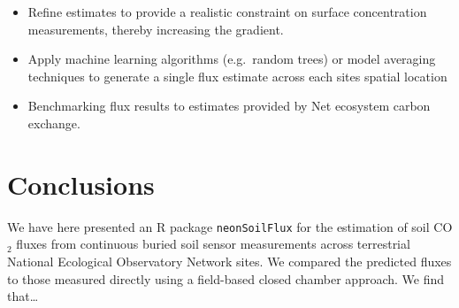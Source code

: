\documentclass[
  letterpaper,
  DIV=11,
  numbers=noendperiod]{scrartcl}
\providecommand{\tightlist}{%
  \setlength{\itemsep}{0pt}\setlength{\parskip}{0pt}}\usepackage{longtable,booktabs,array}
\begin{document}
\begin{itemize}
\tightlist
\item
  Refine estimates to provide a realistic constraint on surface
  concentration measurements, thereby increasing the gradient.
\item
  Apply machine learning algorithms (e.g.~random trees) or model
  averaging techniques to generate a single flux estimate across each
  sites spatial location
\item
  Benchmarking flux results to estimates provided by Net ecosystem
  carbon exchange.
\end{itemize}

\section{Conclusions}\label{conclusions}

We have here presented an R package \texttt{neonSoilFlux} for the
estimation of soil CO\(_{2}\) fluxes from continuous buried soil sensor
measurements across terrestrial National Ecological Observatory Network
sites. We compared the predicted fluxes to those measured directly using
a field-based closed chamber approach. We find that\ldots{}
\end{document}
